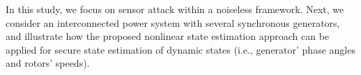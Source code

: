 




In this study, we focus on sensor attack within a noiseless framework. Next, we consider an interconnected power system with several synchronous generators, and illustrate how the proposed nonlinear state estimation approach can be applied for secure state estimation of dynamic states (i.e., generator' phase angles and rotors' speeds).


